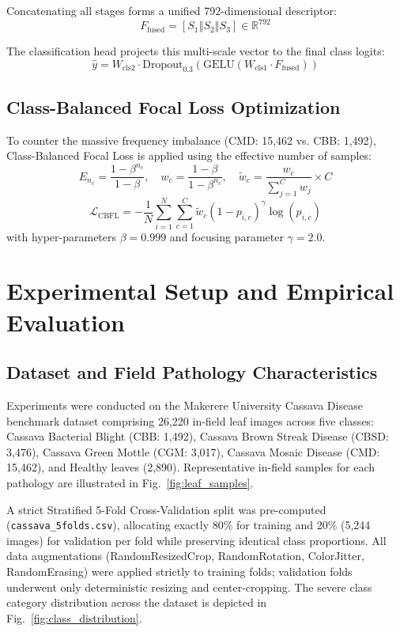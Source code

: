 \documentclass[conference]{IEEEtran}
\let\origsection\section
\renewcommand{\section}{\needspace{6\baselineskip}\origsection}
\let\origsubsection\subsection
\renewcommand{\subsection}{\needspace{5\baselineskip}\origsubsection}
\begin{document}
Concatenating all stages forms a unified 792-dimensional descriptor:
\begin{equation}
F_{\text{fused}} = \left[S_1 \mathbin{\Vert} S_2 \mathbin{\Vert} S_3\right] \in \mathbb{R}^{792}
\end{equation}

The classification head projects this multi-scale vector to the final class logits:
\begin{equation}
\hat{y} = W_{\text{cls2}} \cdot \text{Dropout}_{0.3}\left(\text{GELU}(W_{\text{cls1}} \cdot F_{\text{fused}})\right)
\end{equation}

\subsection{Class-Balanced Focal Loss Optimization}
To counter the massive frequency imbalance (CMD: 15,462 vs. CBB: 1,492), Class-Balanced Focal Loss is applied using the effective number of samples:
\begin{equation}
E_{n_c} = \frac{1 - \beta^{n_c}}{1 - \beta}, \quad w_c = \frac{1 - \beta}{1 - \beta^{n_c}}, \quad \tilde{w}_c = \frac{w_c}{\sum_{j=1}^C w_j} \times C
\end{equation}
\begin{equation}
\mathcal{L}_{\text{CBFL}} = -\frac{1}{N} \sum_{i=1}^N \sum_{c=1}^C \tilde{w}_c \left(1 - p_{i,c}\right)^\gamma \log(p_{i,c})
\end{equation}
with hyper-parameters $\beta = 0.999$ and focusing parameter $\gamma = 2.0$.

\section{Experimental Setup and Empirical Evaluation}

\subsection{Dataset and Field Pathology Characteristics}
Experiments were conducted on the Makerere University Cassava Disease benchmark dataset comprising 26,220 in-field leaf images across five classes: Cassava Bacterial Blight (CBB: 1,492), Cassava Brown Streak Disease (CBSD: 3,476), Cassava Green Mottle (CGM: 3,017), Cassava Mosaic Disease (CMD: 15,462), and Healthy leaves (2,890). Representative in-field samples for each pathology are illustrated in Fig.~\ref{fig:leaf_samples}.

A strict Stratified 5-Fold Cross-Validation split was pre-computed (\texttt{cassava\_5folds.csv}), allocating exactly 80\% for training and 20\% (5,244 images) for validation per fold while preserving identical class proportions. All data augmentations (RandomResizedCrop, RandomRotation, ColorJitter, RandomErasing) were applied strictly to training folds; validation folds underwent only deterministic resizing and center-cropping. The severe class category distribution across the dataset is depicted in Fig.~\ref{fig:class_distribution}.
\end{document}
